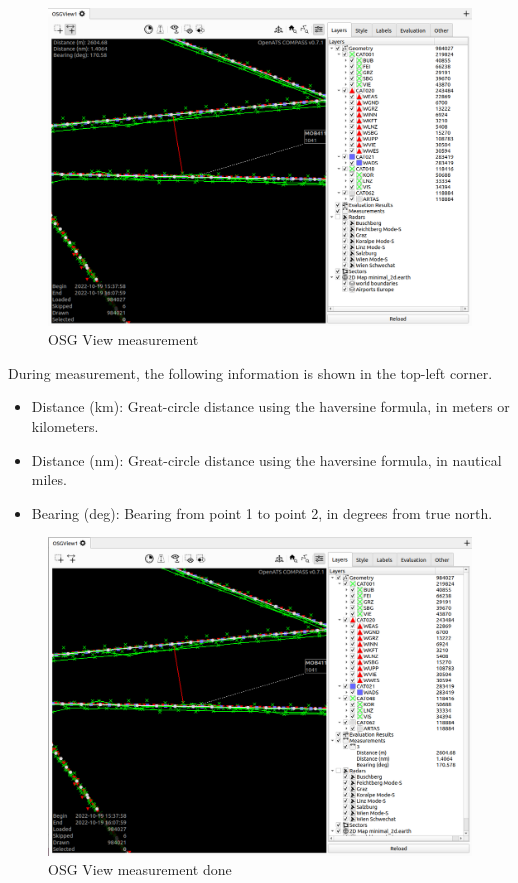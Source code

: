 \begin{figure}[H]
    \hspace*{-2.5cm}
    \includegraphics[width=19cm,frame]{figures/osgview_measure1.png}
  \caption{OSG View measurement}
\end{figure}

During measurement, the following information is shown in the top-left corner.

\begin{itemize}
 \item Distance (km): Great-circle distance using the haversine formula, in meters or kilometers.
 \item Distance (nm): Great-circle distance using the haversine formula, in nautical miles.
 \item  Bearing (deg): Bearing from point 1 to point 2, in degrees from true north.
\end{itemize}

\begin{figure}[H]
    \hspace*{-2.5cm}
    \includegraphics[width=19cm,frame]{figures/osgview_measure2.png}
  \caption{OSG View measurement done}
\end{figure}

